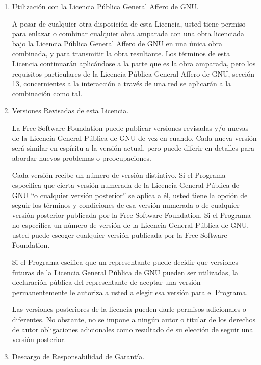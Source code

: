{\begin{enumerate}
\item Utilizaci\'{o}n con la Licencia P\'{u}blica General Affero de GNU.

A pesar de cualquier otra disposici\'{o}n de esta Licencia, usted tiene
permiso para enlazar o combinar cualquier obra amparada con una obra 
licenciada bajo la Licencia P\'{u}blica General Affero de GNU en una \'{u}nica obra 
combinada, y para transmitir la obra resultante. Los t\'{e}rminos de esta 
Licencia continuar\'{a}n aplic\'{a}ndose a la parte que es la obra amparada, pero 
los requisitos particulares de la Licencia P\'{u}blica General Affero de GNU, 
secci\'{o}n 13, concernientes a la interacci\'{o}n a trav\'{e}s de una red se aplicar\'{a}n 
a la combinaci\'{o}n como tal.

\item Versiones Revisadas de esta Licencia.

La Free Software Foundation puede publicar versiones revisadas y/o nuevas 
de la Licencia General P\'{u}blica de GNU de vez en cuando. Cada nueva versi\'{o}n 
ser\'{a} similar en esp\'{i}ritu a la versi\'{o}n actual, pero puede diferir en 
detalles para abordar nuevos problemas o preocupaciones.

Cada versi\'{o}n recibe un n\'{u}mero de versi\'{o}n distintivo. Si el Programa 
especifica que cierta versi\'{o}n numerada de la Licencia General P\'{u}blica de 
GNU ``o cualquier versi\'{o}n posterior'' se aplica a \'{e}l, usted tiene la opci\'{o}n 
de seguir los t\'{e}rminos y condiciones de esa versi\'{o}n numerada o de cualquier 
versi\'{o}n posterior publicada por la Free Software Foundation. Si el Programa 
no especifica un n\'{u}mero de versi\'{o}n de la Licencia General P\'{u}blica de GNU, 
usted puede escoger cualquier versi\'{o}n publicada por la Free Software 
Foundation.

Si el Programa escifica que un representante puede decidir que versiones 
futuras de la Licencia General P\'{u}blica de GNU pueden ser utilizadas, la 
declaraci\'{o}n p\'{u}blica del representante de aceptar una versi\'{o}n permanentemente 
le autoriza a usted a elegir esa versi\'{o}n para el Programa.

Las versiones posteriores de la licencia pueden darle permisos adicionales 
o diferentes. No obstante, no se impone a ning\'{u}n autor o titular de los 
derechos de autor obligaciones adicionales como resultado de su elecci\'{o}n de 
seguir una versi\'{o}n posterior.

\item Descargo de Responsabilidad de Garant\'{i}a.


\end{enumerate}}
